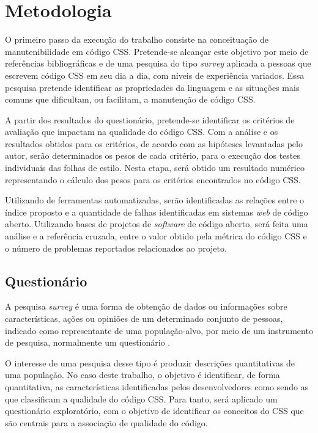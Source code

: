%
%

\chapter{Metodologia}

O primeiro passo da execução do trabalho consiste na conceituação de manutenibilidade em código CSS. Pretende-se alcançar este objetivo por meio de referências bibliográficas e de uma pesquisa do tipo \textit{survey} aplicada a pessoas que escrevem código CSS em seu dia a dia, com níveis de experiência variados. Essa pesquisa pretende identificar as propriedades da linguagem e as situações mais comuns que dificultam, ou facilitam, a manutenção de código CSS.

A partir dos resultados do questionário, pretende-se identificar os critérios de avaliação que impactam na qualidade do código CSS. Com a análise e os resultados obtidos para os critérios, de acordo com as hipóteses levantadas pelo autor, serão determinados os pesos de cada critério, para o execução dos testes individuais das folhas de estilo. Nesta etapa, será obtido um resultado numérico representando o cálculo dos pesos para os critérios encontrados no código CSS.

Utilizando de ferramentas automatizadas, serão identificadas as relações entre o índice proposto e a quantidade de falhas identificadas em sistemas \textit{web} de código aberto. Utilizando bases de projetos de \textit{software} de código aberto, será feita uma análise e a referência cruzada, entre o valor obtido pela métrica do código CSS e o número de problemas reportados relacionados ao projeto.

\section{Questionário}

A pesquisa \textit{survey} é uma forma de obtenção de dados ou informações sobre características, ações ou opiniões de um determinado conjunto de pessoas, indicado como representante de uma população-alvo, por meio de um instrumento de pesquisa, normalmente um questionário \cite{Freitas2000}. 

O interesse de uma pesquisa desse tipo é produzir descrições quantitativas de uma população. No caso deste trabalho, o objetivo é identificar, de forma quantitativa, as características identificadas pelos desenvolvedores como sendo as que classificam a qualidade do código CSS. Para tanto, será aplicado um questionário exploratório, com o objetivo de identificar os conceitos do CSS que são centrais para a associação de qualidade do código.

